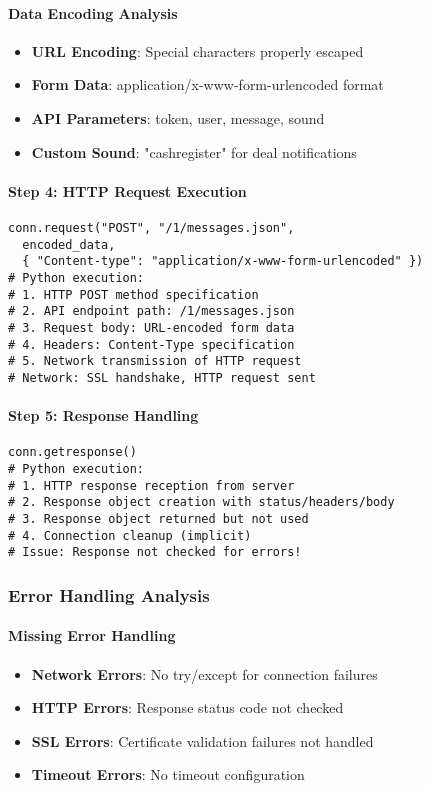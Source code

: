 \paragraph{Data Encoding Analysis}
\begin{itemize}
\item \textbf{URL Encoding}: Special characters properly escaped
\item \textbf{Form Data}: application/x-www-form-urlencoded format
\item \textbf{API Parameters}: token, user, message, sound
\item \textbf{Custom Sound}: "cashregister" for deal notifications
\end{itemize}

\paragraph{Step 4: HTTP Request Execution}
\begin{lstlisting}[caption=POST Request Transmission]
conn.request("POST", "/1/messages.json",
  encoded_data,
  { "Content-type": "application/x-www-form-urlencoded" })
# Python execution:
# 1. HTTP POST method specification
# 2. API endpoint path: /1/messages.json
# 3. Request body: URL-encoded form data
# 4. Headers: Content-Type specification
# 5. Network transmission of HTTP request
# Network: SSL handshake, HTTP request sent
\end{lstlisting}

\paragraph{Step 5: Response Handling}
\begin{lstlisting}[caption=Response Processing]
conn.getresponse()
# Python execution:
# 1. HTTP response reception from server
# 2. Response object creation with status/headers/body
# 3. Response object returned but not used
# 4. Connection cleanup (implicit)
# Issue: Response not checked for errors!
\end{lstlisting}

\subsubsection{Error Handling Analysis}

\paragraph{Missing Error Handling}
\begin{itemize}
\item \textbf{Network Errors}: No try/except for connection failures
\item \textbf{HTTP Errors}: Response status code not checked
\item \textbf{SSL Errors}: Certificate validation failures not handled
\item \textbf{Timeout Errors}: No timeout configuration
\end{itemize}

